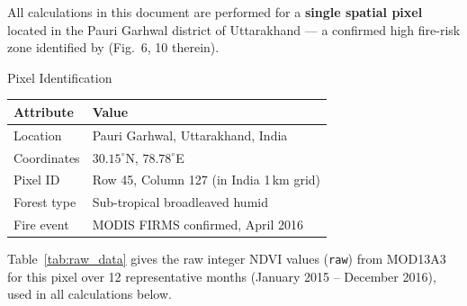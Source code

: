 \documentclass[12pt, a4paper]{article}
\begin{document}
All calculations in this document are performed for a \textbf{single
spatial pixel} located in the Pauri Garhwal district of Uttarakhand
--- a confirmed high fire-risk zone identified by
\citet{biswas2025} (Fig.~6, 10 therein).

\begin{databox}{Pixel Identification}
\begin{center}
\begin{tabular}{ll}
\toprule
\textbf{Attribute} & \textbf{Value} \\
\midrule
Location     & Pauri Garhwal, Uttarakhand, India \\
Coordinates  & $30.15^{\circ}$N, $78.78^{\circ}$E \\
Pixel ID     & Row 45, Column 127 (in India 1\,km grid) \\
Forest type  & Sub-tropical broadleaved humid \\
Fire event   & MODIS FIRMS confirmed, April 2016 \\
\bottomrule
\end{tabular}
\end{center}
\end{databox}

\vspace{0.5em}

Table~\ref{tab:raw_data} gives the raw integer NDVI values
(\texttt{raw}) from MOD13A3 for this pixel over 12 representative
months (January 2015 -- December 2016), used in all calculations below.
\end{document}
